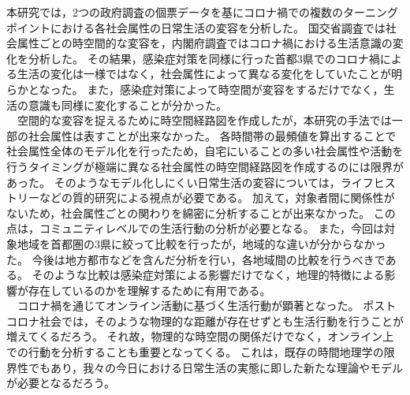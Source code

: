\documentclass[paper={210mm,297mm},line_length=35zw,number_of_lines=31,head_space=30mm,gutter=40mm,baselineskip=2.0zw,headfoot_verticalposition=1.5zw]{jlreq} %
\begin{document}
本研究では，2つの政府調査の個票データを基にコロナ禍での複数のターニングポイントにおける各社会属性の日常生活の変容を分析した。
国交省調査では社会属性ごとの時空間的な変容を，内閣府調査ではコロナ禍における生活意識の変化を分析した。
その結果，感染症対策を同様に行った首都3県でのコロナ禍による生活の変化は一様ではなく，社会属性によって異なる変化をしていたことが明らかとなった。
また，感染症対策によって時空間が変容をするだけでなく，生活の意識も同様に変化することが分かった。\\
　空間的な変容を捉えるために時空間経路図を作成したが，本研究の手法では一部の社会属性は表すことが出来なかった。
各時間帯の最頻値を算出することで社会属性全体のモデル化を行ったため，自宅にいることの多い社会属性や活動を行うタイミングが極端に異なる社会属性の時空間経路図を作成するのには限界があった。
そのようなモデル化しにくい日常生活の変容については，ライフヒストリーなどの質的研究による視点が必要である。
加えて，対象者間に関係性がないため，社会属性ごとの関わりを綿密に分析することが出来なかった。
この点は，コミュニティレベルでの生活行動の分析が必要となる。
また，今回は対象地域を首都圏の3県に絞って比較を行ったが，地域的な違いが分からなかった。
今後は地方都市などを含んだ分析を行い，各地域間の比較を行うべきである。
そのような比較は感染症対策による影響だけでなく，地理的特徴による影響が存在しているのかを理解するために有用である。\\
　コロナ禍を通じてオンライン活動に基づく生活行動が顕著となった。
ポストコロナ社会では，そのような物理的な距離が存在せずとも生活行動を行うことが増えてくるだろう。
それ故，物理的な時空間の関係だけでなく，オンライン上での行動を分析することも重要となってくる。
これは，既存の時間地理学の限界性でもあり，我々の今日における日常生活の実態に即した新たな理論やモデルが必要となるだろう。\\
\end{document}
